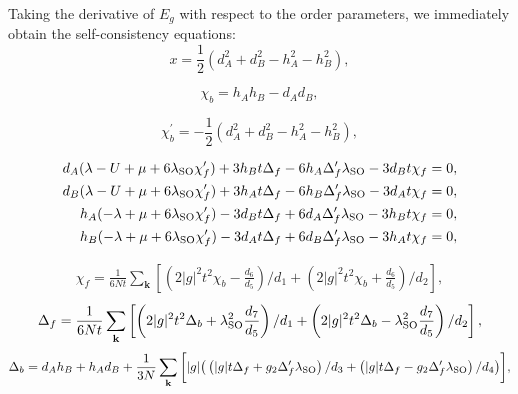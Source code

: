 \documentclass[aps,prb,twocolumn,superscriptaddress,showpacs]{revtex4-1}
\begin{document}
\begin{widetext}
Taking the derivative of $E_g$ with respect to the order parameters, we immediately obtain the self-consistency equations:
\begin{equation}
\label{eq-x}
x=\frac{1}{2}(d_A^2+d_B^2-h_A^2-h_B^2),
\end{equation}

\begin{equation}
\label{eq-chib}
\chi_b = h_A h_B - d_A d_B,
\end{equation}

\begin{equation}
\label{eq-chibp}
\chi_{b}^{\prime}=-\frac{1}{2}(d_A^2+d_B^2-h_A^2-h_B^2),
\end{equation}

\begin{eqnarray}
 {d_A}( \lambda- U+ \mu +6\lambda_{\rm{SO}} \chi_{f}^{\prime})+3  {h_B} t \Delta _f-6  {h_A} \Delta_{f}^{\prime} \lambda_{\rm{SO}}-3  {d_B} t \chi _f=0, \\
 d_B(\lambda - U +\mu +6 \lambda_{\rm{SO}} \chi_{f}^{\prime})  +3  {h_A} t \Delta _f-6  {h_B} \Delta_{f}^{\prime} \lambda_{\rm{SO}}-3  {d_A} t \chi _f =0,\\
 {h_A}( -\lambda+  \mu +6  \lambda_{\rm{SO}} \chi_{f}^{\prime}) -3  {d_B} t \Delta _f+6  {d_A} \Delta_{f}^{\prime} \lambda_{\rm{SO}}-3  {h_B} t \chi _f =0, \\
 {h_B}( -\lambda+ \mu +6 \lambda_{\rm{SO}} \chi_{f}^{\prime})-3  {d_A} t \Delta _f+6  {d_B} \Delta_{f}^{\prime} \lambda_{\rm{SO}}-3  {h_A} t \chi _f=0,
\end{eqnarray}

\begin{eqnarray}
\label{eq-chif}
\chi_f = \frac{1}{6Nt}\sum_{\textbf{k}} \left[  \left(2|g|^2 t^2 \chi_b-\frac{d_6}{d_5}\right)/d_1 +\left(2|g|^2 t^2 \chi_b + \frac{d_6}{d_5}\right)/d_2 \right],
\end{eqnarray}
%
\begin{eqnarray}
\label{eq-Deltaf}
\Delta_f = \frac{1}{6Nt}\sum_{\textbf{k}} \left [    \left(2|g|^2 t^2 \Delta_b+ \lambda_{\rm{SO}}^2 \frac{d_7}{d_5}\right )/d_1 +\left(2 |g|^2 t^2 \Delta_b- \lambda_{\rm{SO}}^2\frac{d_7}{d_5}\right)/d_2  \right],
\end{eqnarray}
%
\begin{equation}
\label{eq-Deltab}
\Delta_b = d_A h_B + h_A d_B + \frac{1}{3N}\sum_{\textbf{k}}\bigg[  |g|  \big( \left(|g| t \Delta_f+g_2 \Delta_{f}^{\prime} \lambda_{\rm{SO}} \right)/d_3
      + \left(|g| t \Delta_f-g_2 \Delta_{f}^{\prime} \lambda_{\rm{SO}} \right) /d_4 \big )\bigg],
\end{equation}


\end{widetext}
\end{document}
